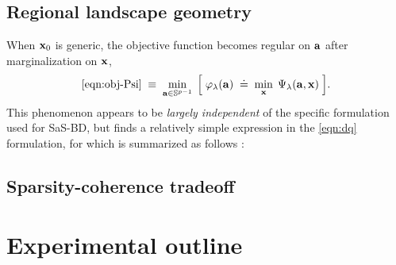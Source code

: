\documentclass{article}
\numberwithin{equation}{section}
\begin{document}
\subsection{Regional landscape geometry}
When $\mathbf{x}_0$ is generic, the objective function becomes regular on $\mathbf{a}$ after marginalization on $\mathbf{x}$,
\begin{equation} \label{eqn:obj-phi}
  \eqref{eqn:obj-Psi} \;\equiv\; \min_{\mathbf{a} \in \mathbb{S}^{p-1}} \;\Big[\;
    \varphi_\lambda(\mathbf{a}) \;\doteq\; \min_{\mathbf{x}}\; \Psi_\lambda(\mathbf{a}, \mathbf{x})
  \;\Big].
\end{equation}
This phenomenon appears to be {\em largely independent} of the specific formulation used for SaS-BD, but finds a relatively simple expression in the \eqref{eqn:dq} formulation, for which is summarized as follows \cite{kuo2019geometry}:


\subsection{Sparsity-coherence tradeoff}


\section{Experimental outline}

{\small


}
\end{document}
